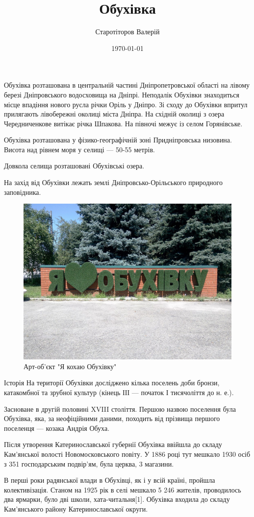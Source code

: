 \documentclass[12pt]{article} %
\title{Обухівка}
\date{\today}
\author{Старотіторов Валерій }
\begin{document}
	\maketitle	              
	
Обухівка розташована в центральній частині Дніпропетровської області на лівому березі Дніпровського водосховища на Дніпрі. Неподалік Обухівки знаходиться місце впадіння нового русла річки Оріль у Дніпро. Зі сходу до Обухівки впритул прилягають лівобережні околиці міста Дніпра. На східній околиці з озера Чередниченкове витікає річка Шпакова. На півночі межує із селом Горянівське.

Обухівка розташована у фізико-географічній зоні Придніпровська низовина. Висота над рівнем моря у селищі — 50-55 метрів.

Довкола селища розташовані Обухівські озера.

На захід від Обухівки лежать землі Дніпровсько-Орільського природного заповідника.
\begin{figure}
	\centering
	\includegraphics[width=0.7\linewidth]{25}
	\caption{Арт-об'єкт "Я кохаю Обухівку"}
	\label{fig:25}
\end{figure}


Історія
На території Обухівки досліджено кілька поселень доби бронзи, катакомбної та зрубної культур (кінець ІІІ — початок І тисячоліття до н. е.).

Засноване в другій половині XVIII століття. Першою назвою поселення була Обухівка, яка, за неофіційними даними, походить від прізвища першого поселенця — козака Андрія Обуха.

Після утворення Катеринославської губернії Обухівка ввійшла до складу Кам'янської волості Новомосковського повіту. У 1886 році тут мешкало 1930 осіб з 351 господарським подвір'ям, була церква, 3 магазини.

В перші роки радянської влади в Обухівці, як і у всій країні, пройшла колективізація. Станом на 1925 рік в селі мешкало 5 246 жителів, проводилось два ярмарки, було дві школи, хата-читальня[1]. Обухівка входила до складу Кам'янського району Катеринославської округи.
\end{document}
